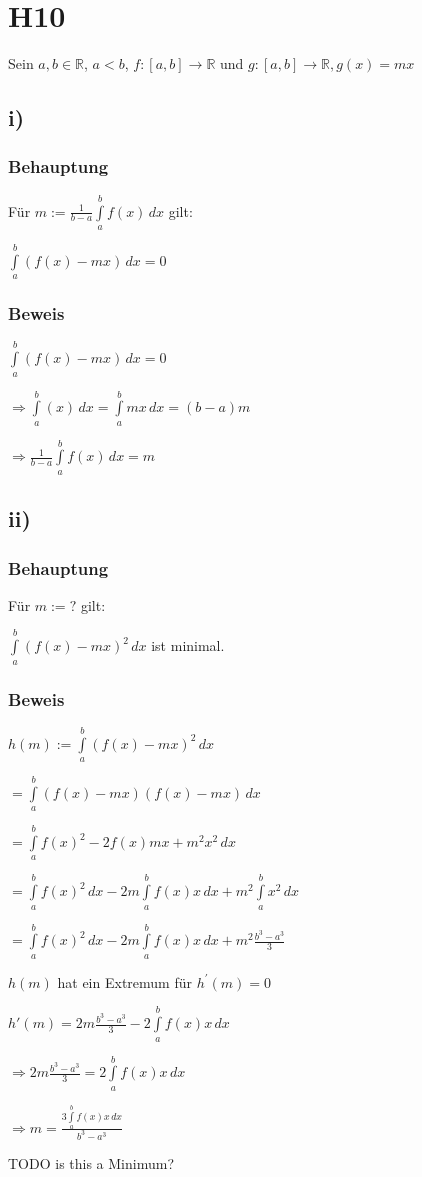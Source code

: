 \section*{H10}

Sein $a,b \in \mathbb{R}$, $a < b$, $f : [a,b] \to \mathbb{R}$ und $g:[a,b] \to \mathbb{R}, g(x)=mx$

\subsection*{i)}

\subsubsection*{Behauptung}

	Für $m := \frac{1}{b-a} \int\limits_{a}^{b}f(x) \,dx$ gilt:
	
	$\int\limits_{a}^{b}(f(x)-mx)\,dx = 0$
	
\subsubsection*{Beweis}

$\int\limits_{a}^{b}(f(x)-mx)\,dx = 0$

$\Rightarrow \int\limits_{a}^{b}(x)\,dx = \int\limits_{a}^{b}mx\,dx = (b-a)m$

$\Rightarrow \frac{1}{b-a} \int\limits_{a}^{b}f(x) \,dx = m$

\subsection*{ii)}

\subsubsection*{Behauptung}

Für $m := ?$ gilt:

$\int\limits_{a}^{b}(f(x)-mx)^{2}\,dx$ ist minimal.

\subsubsection*{Beweis}

$ h(m) := \int\limits_{a}^{b}(f(x)-mx)^{2}\,dx$

$ = \int\limits_{a}^{b}(f(x)-mx)(f(x)-mx)\,dx$


$ = \int\limits_{a}^{b}f(x)^{2}-2f(x)mx+m^{2}x^{2}\,dx$

$ = \int\limits_{a}^{b}f(x)^{2}\,dx 
-2m\int\limits_{a}^{b}f(x)x\,dx 
+ m^{2}\int\limits_{a}^{b}x^{2}\,dx$

$ = \int\limits_{a}^{b}f(x)^{2}\,dx 
-2m\int\limits_{a}^{b}f(x)x\,dx 
+ m^{2}\frac{b^{3}-a^{3}}{3}$

$h(m)$ hat ein Extremum für $h^{\prime}(m) = 0$

$ h'(m) = 2m\frac{b^{3}-a^{3}}{3} - 2\int\limits_{a}^{b}f(x)x\,dx $

$\Rightarrow 2m\frac{b^{3}-a^{3}}{3} =  2\int\limits_{a}^{b}f(x)x\,dx $

$\Rightarrow m =  \frac{3\int\limits_{a}^{b}f(x)x\,dx}{b^{3}-a^{3}} $

TODO is this a Minimum?

